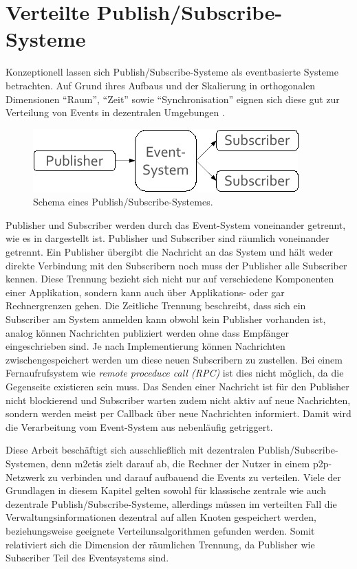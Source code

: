 \section{Verteilte Publish/Subscribe-Systeme}
\label{chap:grundlagen:pubsub}
Konzeptionell lassen sich Publish/Subscribe-Systeme als eventbasierte Systeme betrachten. Auf Grund ihres Aufbaus und der Skalierung  in orthogonalen Dimensionen \enquote{Raum}, \enquote{Zeit} sowie \enquote{Synchronisation} eignen sich diese gut zur Verteilung von Events in dezentralen Umgebungen \cite{PatrickTh2003Many, Cugola2002Using}.

\begin{figure}[htbp]
\centering
\includegraphics{grafics/pubsub_black_box.pdf}
\caption{Schema eines Publish/Subscribe-Systemes.}
\label{fig:pubsub_black_box}
\end{figure}

Publisher und Subscriber werden durch das Event-System voneinander getrennt, wie es in  dargestellt ist.  Publisher und Subscriber sind räumlich voneinander getrennt. Ein Publisher übergibt die Nachricht an das System und hält weder direkte Verbindung mit den Subscribern noch muss der Publisher alle Subscriber kennen. Diese Trennung bezieht sich nicht nur auf verschiedene Komponenten einer Applikation, sondern kann auch über Applikations- oder gar Rechnergrenzen gehen. Die Zeitliche Trennung beschreibt, dass sich ein Subscriber am System anmelden kann obwohl kein Publisher vorhanden ist, analog können Nachrichten publiziert werden ohne dass Empfänger eingeschrieben sind. Je nach Implementierung können Nachrichten zwischengespeichert werden um diese neuen Subscribern zu zustellen. Bei einem Fernaufrufsystem wie \emph{remote proceduce call (RPC)} \cite{Birrell1984Implementing} ist dies nicht möglich, da die Gegenseite existieren sein muss. Das Senden einer Nachricht ist für den Publisher nicht blockierend und Subscriber warten zudem nicht aktiv auf neue Nachrichten, sondern werden meist per Callback über neue Nachrichten informiert. Damit wird die Verarbeitung vom Event-System aus nebenläufig getriggert.

Diese Arbeit beschäftigt sich ausschließlich mit dezentralen Publish/Subscribe-Sys\-temen, denn \ac{m2etis} zielt darauf ab, die Rechner der Nutzer in einem p2p-Netzwerk zu verbinden und darauf aufbauend die Events zu verteilen. Viele der Grundlagen in diesem Kapitel gelten sowohl für klassische zentrale wie auch dezentrale Publish/Subscribe-Systeme, allerdings müssen im verteilten Fall die Verwaltungsinformationen dezentral auf allen Knoten gespeichert werden, beziehungsweise geeignete Verteilunsalgorithmen gefunden werden. Somit relativiert sich die Dimension der räumlichen Trennung, da Publisher wie Subscriber Teil des Eventsystems sind.

